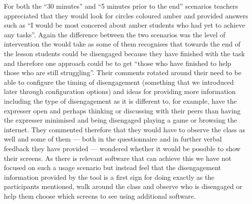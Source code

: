 {{For both the “30 minutes” and “5 minutes prior to the end” scenarios
teachers appreciated that they would look for circles coloured amber
and provided answers such as “I would be most concered about amber
students who had yet to achieve any tasks”. Again the difference
between the two scenarios was the level of intervention the would take
as some of them recognises that towards the end of the lesson students
could be disengaged because they have finished with the task and
therefore one approach could be to get “those who have finished to
help those who are still struggling”. Their comments rotated around
their need to be able to configure the timing of disengagement
(something that we introduced later through configuration options) and
ideas for providing more information including the type of
disengagement as it is different to, for example, have the expresser
open and perhaps thinking or discussing with their peers than having
the expresser minimised and being disengaged playing a game or
browsing the internet. They commented therefore that they would have
to observe the class as well and some of them --- both in the
questionnaire and in further verbal feedback they have provided ---
wondered whether it would be possible to show their screens. As there
is relevant software that can achieve this we have not focused on such
a usage scenario but instead feel that the disengagement information
provided by the tool is a first sign for doing exactly as the
participants mentioned, walk around the class and observe who is
disengaged or help them choose which screens to see using additional
software. 



}}
